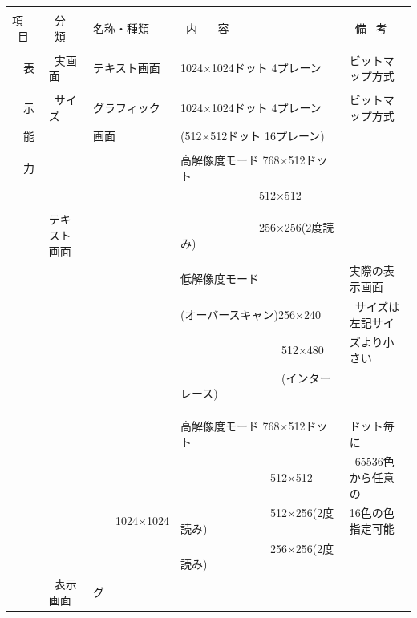 ﻿\documentclass[twoside,a4paper,12pt]{article}
\begin{document}
\setlength{\tabcolsep}{0.5mm}
\begin{tabular}{|p{13mm}|p{23mm}|p{4mm}|p{20mm}|p{65mm}|p{36mm}|}
\hline
& & \multicolumn{2}{l|}{} & &\\[-2mm]
項 \ 目& \ 分 \ 類 & \multicolumn{2}{l|}{名称・種類} & \ 内 \ \ \ 容 & \ 備 \ 考\\[1mm]
\hline
& & \multicolumn{2}{l|}{} & &\\[-1mm]
\ \ 表 & \ 実画面 & \multicolumn{2}{l|}{テキスト画面} & 1024×1024ドット 4プレーン & ビットマップ方式\\
\cline{3-6}
& & \multicolumn{2}{l|}{} & &\\[-4mm]
\ \ 示 & \ サイズ & \multicolumn{2}{l|}{グラフィック} & 1024×1024ドット 4プレーン & ビットマップ方式\\
\ \ 能 & & \multicolumn{2}{l|}{画面} & (512×512ドット 16プレーン) &\\
\cline{2-6}
& & \multicolumn{2}{l|}{} & &\\[-4mm]
\ \ 力 & & \multicolumn{2}{l|}{} & 高解像度モード 768×512ドット &\\
& & \multicolumn{2}{l|}{} & \ \ \ \ \ \ \ \ \ \ \ \ \ \ 512×512 &\\
& & \multicolumn{2}{l|}{} & &\\
& テキスト画面 & \multicolumn{2}{l|}{} & \ \ \ \ \ \ \ \ \ \ \ \ \ \ 256×256(2度読み) &\\
& & \multicolumn{2}{l|}{} & 低解像度モード & 実際の表示画面\\
& & \multicolumn{2}{l|}{} & (オーバースキャン)256×240 & \ サイズは左記サイ\\
& & \multicolumn{2}{l|}{} & \ \ \ \ \ \ \ \ \ \ \ \ \ \ \ \ \ \ 512×480 & ズより小さい\\
& & \multicolumn{2}{l|}{} & \ \ \ \ \ \ \ \ \ \ \ \ \ \ \ \ \ \ (インターレース) &\\
& & \multicolumn{2}{l|}{} & &\\
& & \multicolumn{2}{l|}{} & &\\
\cline{2-6}
& & & & &\\[-4mm]
& & & & 高解像度モード 768×512ドット & ドット毎に\\
& & & & \ \ \ \ \ \ \ \ \ \ \ \ \ \ \ \ 512×512 & \ 65536色から任意の\\
& & & 1024×1024 & \ \ \ \ \ \ \ \ \ \ \ \ \ \ \ \ 512×256(2度読み) & 16色の色指定可能\\
& & & & \ \ \ \ \ \ \ \ \ \ \ \ \ \ \ \ 256×256(2度読み) &\\
& \ 表示画面 & グ & & &\\[2mm]

\end{tabular}
\end{document}
